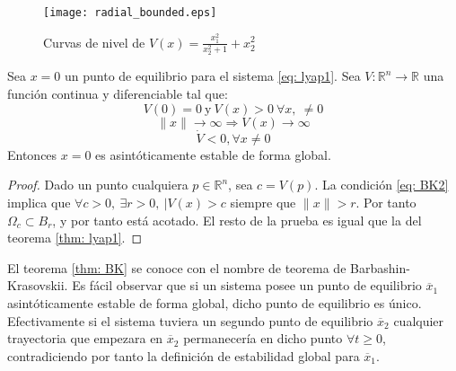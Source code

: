 \begin{figure}
 \centering
 \texttt{[image: radial\_bounded.eps]}
\caption{Curvas de nivel de $V(x) = \frac{x_1^2}{x_2^2+1}+x_2^2$}
\label{fig: radunb}
\end{figure}


\begin{theorem}\label{thm: BK}
Sea $x=0$ un punto de equilibrio para el sistema \ref{eq: lyap1}. Sea $V: \mathbb{R}^n \to \mathbb{R}$ una función continua y diferenciable tal que:
\begin{equation}
V(0) = 0 \ \text{y} \ V(x) > 0\ \forall x,\  \neq 0 
\end{equation}
\begin{equation} \label{eq: BK2}
\|x\| \to \infty \Rightarrow V(x) \to \infty
\end{equation}
\begin{equation}
\dot V < 0, \forall x \neq 0
\end{equation}
Entonces $x=0$ es asintóticamente estable de forma global. 
\end{theorem} 
\begin{proof}
Dado un punto cualquiera $p \in \mathbb{R}^n$, sea $c = V(p)$. La condición \ref{eq: BK2} implica que $\forall c>0,\ \exists r>0,\ \vert V(x) > c$ siempre que $\|x\| >r$. Por tanto $\Omega_c \subset B_r$, y por tanto está acotado. El resto de la prueba es igual que la del teorema \ref{thm: lyap1}.
\end{proof}

El teorema \ref{thm: BK} se conoce con el nombre de teorema de Barbashin-Krasovskii. Es fácil observar que si un sistema posee un punto de equilibrio $\overline x_1 $ asintóticamente estable de forma global, dicho punto de equilibrio es único. Efectivamente si el sistema tuviera un segundo punto de equilibrio $\overline x_2$ cualquier trayectoria que empezara en $\overline x_2$ permanecería en dicho punto $\forall t\geq 0$, contradiciendo por tanto la definición de estabilidad global para $\overline x_1$.

